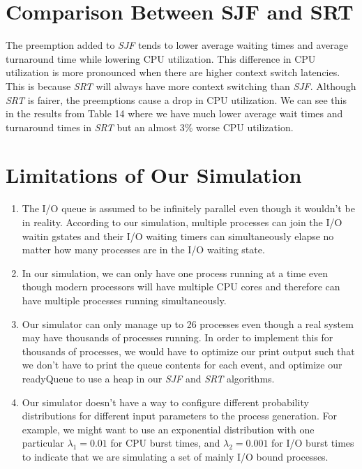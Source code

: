 \documentclass{article}
\begin{document}
\section{Comparison Between SJF and SRT}
\begin{doublespace}
The preemption added to \textit{SJF} tends to lower average waiting times and average turnaround time while lowering
CPU utilization. This difference in CPU utilization is more pronounced when there are higher context switch latencies. 
This is because \textit{SRT} will always have more context switching than \textit{SJF}. Although \textit{SRT} is fairer,
the preemptions cause a drop in CPU utilization. We can see this in the results from Table 14 where we have 
much lower average wait times and turnaround times in \textit{SRT} but an almost 3\% worse CPU utilization. 
\end{doublespace}
\section{Limitations of Our Simulation}
\begin{doublespace}
\begin{enumerate}
  \item The I/O queue is assumed to be infinitely parallel even though it wouldn't be in reality. 
  According to our simulation, multiple processes can join the I/O waitin gstates and their I/O waiting timers
  can simultaneously elapse no matter how many processes are in the I/O waiting state.
  \item In our simulation, we can only have one process running at a time even though modern processors will have 
  multiple CPU cores and therefore can have multiple processes running simultaneously.
  \item Our simulator can only manage up to 26 processes even though a real system may have thousands of processes running. 
  In order to implement this for thousands of processes, we would have to optimize our print output such that we don't 
  have to print the queue contents for each event, and optimize our readyQueue to use a heap in our \textit{SJF} and \textit{SRT}
  algorithms.
  \item Our simulator doesn't have a way to configure different probability distributions for different input parameters
  to the process generation. For example, we might want to use an exponential distribution with one particular $\lambda_1 = 0.01$
  for CPU burst times, and $\lambda_2 = 0.001$ for I/O burst times to indicate that we are simulating a set of mainly I/O bound 
  processes.
\end{enumerate}
\end{doublespace}
\end{document}
